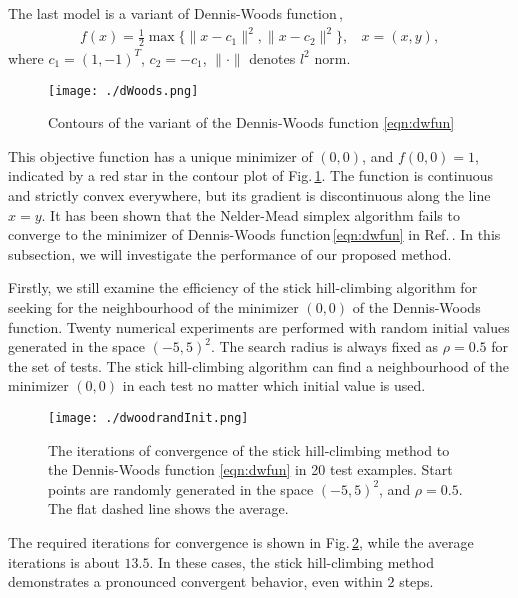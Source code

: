 \documentclass[mathpazo]{aamm}
\newcommand{\bmx}{x}
\begin{document}
The last model is a variant of Dennis-Woods
function\,\cite{kolda2003optimization, dennis1987optimization},
\begin{align}
	f(\bmx) = \frac{1}{2}\max\{\|\bmx - c_1 \|^2, \|\bmx - c_2
	\|^2\}, ~~~~ \bmx = (x,y),
	\label{eqn:dwfun}
\end{align}
where $c_1 = (1,-1)^T$, $c_2 = -c_1$, $\|\cdot\|$ denotes
$l^2$ norm. 
\begin{figure}[!htbp]
	\centering
	  \texttt{[image: ./dWoods.png]}
	\caption{Contours of the variant of the Dennis-Woods 
	function \eqref{eqn:dwfun}}
\label{fig:dwfun}
\end{figure}
This objective function has
a unique minimizer of $(0,0)$, and $f(0,0)=1$, indicated by a red
star in the contour plot of Fig.\,\ref{fig:dwfun}. 
The function is continuous and strictly convex everywhere,
but its gradient is discontinuous along the line $x = y$. 
It has been shown that the Nelder-Mead simplex algorithm fails to
converge to the minimizer of Dennis-Woods function\,\eqref{eqn:dwfun} in
Ref.\,\cite{dennis1987optimization}. In this subsection, we will
investigate the performance of our proposed method.

Firstly, we still examine the efficiency of the stick hill-climbing algorithm
for seeking for the neighbourhood of the minimizer $(0,0)$ of the Dennis-Woods function.
Twenty numerical experiments are performed with random 
initial values generated in the space $(-5,5)^2$. The search
radius is always fixed as $\rho=0.5$ for the set of tests. 
The stick hill-climbing algorithm can find a neighbourhood of the
minimizer $(0,0)$ in each test no matter which initial value is used.
\begin{figure}[!htbp]
	\centering
	\texttt{[image: ./dwoodrandInit.png]}
	  \caption{The iterations of convergence of the stick
	  hill-climbing method to the Dennis-Woods function
	  \eqref{eqn:dwfun} in 20 test examples.
	  Start points are randomly generated in the space
	  $(-5, 5)^2$, and $\rho=0.5$.
	  The flat dashed line shows the average.} 
	  \label{fig:dwfun:randInit}
\end{figure}
The required iterations for convergence is shown in 
Fig.\,\ref{fig:dwfun:randInit}, while the average iterations is
about $13.5$. In these cases, the stick hill-climbing method
demonstrates a pronounced convergent behavior, even within $2$
steps.
\end{document}
